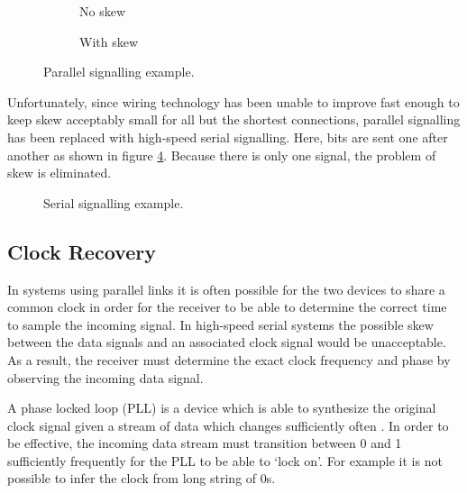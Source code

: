			\begin{figure}
				\begin{subfigure}[b]{0.49\textwidth}
					\center
					
					\caption{No skew}
					\label{fig:parallel-example-no-skew}
				\end{subfigure}
				\begin{subfigure}[b]{0.49\textwidth}
					\center
					
					\caption{With skew}
					\label{fig:parallel-example-skew}
				\end{subfigure}
				
				\caption{Parallel signalling example.}
				\label{fig:parallel-example}
			\end{figure}
			
			Unfortunately, since wiring technology has been unable to improve fast
			enough to keep skew acceptably small for all but the shortest connections,
			parallel signalling has been replaced with high-speed serial signalling.
			Here, bits are sent one after another as shown in figure
			\ref{fig:serial-example}. Because there is only one signal, the problem of
			skew is eliminated.
			
			\begin{figure}
				\center
				\begin{tikzpicture}
					
				\end{tikzpicture}
				
				\caption{Serial signalling example.}
				\label{fig:serial-example}
			\end{figure}
		
		
		\subsection{Clock Recovery}
			
			In systems using parallel links it is often possible for the two devices
			to share a common clock in order for the receiver to be able to determine
			the correct time to sample the incoming signal. In high-speed serial
			systems the possible skew between the data signals and an associated clock
			signal would be unacceptable. As a result, the receiver must determine the
			exact clock frequency and phase by observing the incoming data signal.
			
			A phase locked loop (PLL) is a device which is able to synthesize the
			original clock signal given a stream of data which changes sufficiently
			often \cite{athavale05}. In order to be effective, the incoming data
			stream must transition between 0 and 1 sufficiently frequently for the PLL
			to be able to `lock on'. For example it is not possible to infer the clock
			from long string of 0s.
			
